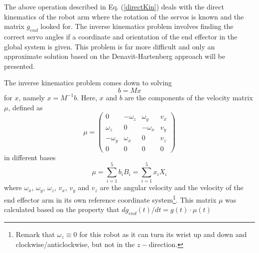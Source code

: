 \documentclass[a4paper,11pt,oneside,onecolumn]{article}
\begin{document}
The above operation described in Eq. (\ref{directKin}) deals with the direct kinematics of the robot arm where the rotation of the servos is known and the matrix $g_{end}$ looked for. The inverse kinematics problem involves finding the correct servo angles if a coordinate and orientation of the end effector in the global system is given. This problem is far more difficult and only an approximate solution based on the Denavit-Hartenberg approach will be presented.

The inverse kinematics problem comes down to solving
\begin{equation}
b=Mx
\end{equation}
for $x$, namely $x=M^{-1}b$. Here, $x$ and $b$ are the components of the velocity matrix $\mu$, defined as
\begin{equation}
\mu = \left(
\begin{matrix}
0 & -\omega_z & \omega_y & v_x \\
\omega_z & 0 & -\omega_x & v_y \\
-\omega_y & \omega_x & 0 & v_z \\
0 & 0 & 0 & 0
\end{matrix}
\right)
\end{equation}
in different bases
\begin{equation}
\mu=\sum_{i=1}^5 b_i B_i=\sum_{i=1}^5 x_i X_i
\end{equation}
where $\omega_x$, $\omega_y$, $\omega_z$, $v_x$, $v_y$ and $v_z$ are the angular velocity and the velocity of the end effector arm in its own reference coordinate system\footnote{Remark that $\omega_z\equiv 0$ for this robot as it can turn its wrist up and down and clockwise/anticlockwise, but not in the $z-$direction.}. This matrix $\mu$ was calculated based on the property that $dg_{end}(t)/dt=g(t)\cdot \mu(t)$
\end{document}
